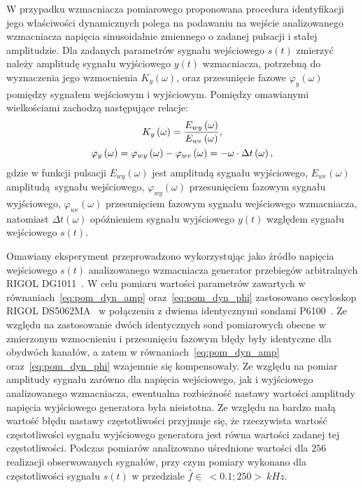 W przypadku wzmacniacza pomiarowego proponowana procedura identyfikacji jego właściwości dynamicznych polega na podawaniu na wejście analizowanego wzmacniacza napięcia sinusoidalnie zmiennego o zadanej pulsacji i stałej amplitudzie. Dla zadanych parametrów sygnału wejściowego $s(t)$ zmierzyć należy amplitudę sygnału wyjściowego $y(t)$ wzmacniacza, potrzebną do wyznaczenia jego wzmocnienia $K_{y}(\omega)$, oraz przesunięcie fazowe $\varphi_{y}(\omega)$ pomiędzy sygnałem wejściowym i wyjściowym. Pomiędzy omawianymi wielkościami zachodzą następujące relacje:
\begin{gather}
K_{y} \left(\omega\right) = \frac{E_{wy} \left(\omega\right)}{E_{we} \left(\omega\right)} \label{eq:pom_dyn_amp}, \\
\varphi_{y} \left(\omega\right) = \varphi_{wy} \left(\omega\right) - \varphi_{we} \left(\omega\right) = -\omega \cdot \Delta t \left(\omega\right) \label{eq:pom_dyn_phi},
\end{gather}
gdzie w funkcji pulsacji $E_{wy}(\omega)$ jest amplitudą sygnału wyjściowego, $E_{we}(\omega)$ amplitudą sygnału wejściowego, $\varphi_{wy}(\omega)$ przesunięciem fazowym sygnału wyjściowego, $\varphi_{we}(\omega)$ przesunięciem fazowym sygnału wejściowego wzmacniacza, natomiast $\Delta t(\omega)$ opóźnieniem sygnału wyjściowego $y(t)$ względem sygnału wejściowego $s(t)$.

Omawiany eksperyment przeprowadzono wykorzystując jako źródło napięcia wejściowego $s(t)$ analizowanego wzmacniacza generator przebiegów arbitralnych RIGOL DG1011~\cite{rigol_fawg}. W celu pomiaru wartości parametrów zawartych w równaniach~\eqref{eq:pom_dyn_amp} oraz~\eqref{eq:pom_dyn_phi} zastosowano oscyloskop RIGOL DS5062MA~\cite{rigol_dso} w połączeniu z dwiema identycznymi sondami P6100~\cite{wellzion_probes}. Ze względu na zastosowanie dwóch identycznych sond pomiarowych obecne w zmierzonym wzmocnieniu i przesunięciu fazowym błędy były identyczne dla obydwóch kanałów, a zatem w równaniach~\eqref{eq:pom_dyn_amp} oraz~\eqref{eq:pom_dyn_phi} wzajemnie się kompensowały. Ze względu na pomiar amplitudy sygnału zarówno dla napięcia wejściowego, jak i wyjściowego analizowanego wzmacniacza, ewentualna rozbieżność nastawy wartości amplitudy napięcia wyjściowego generatora była nieistotna. Ze względu na bardzo małą wartość błędu nastawy częstotliwości przyjmuje się, że rzeczywista wartość częstotliwości sygnału wyjściowego generatora jest równa wartości zadanej tej częstotliwości. Podczas pomiarów analizowano uśrednione wartości dla $256$ realizacji obserwowanych sygnałów, przy czym pomiary wykonano dla częstotliwości sygnału $s(t)$ w przedziale $\hat{f} \in~<0.1;250>~\unit{kHz}$.

